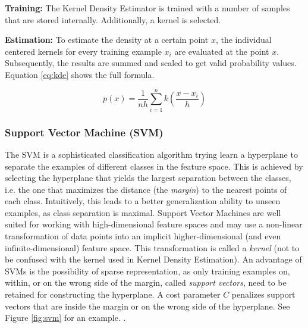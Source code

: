 \documentclass[
	ruledheaders=chapter,
	class=report,
	thesis={type=master, department=inf},
	accentcolor=1c,
	custommargins=true,
	marginpar=false,
	parskip=half-,
	fontsize=11pt,
]{tudapub}
\begin{document}
	\textbf{Training:} The Kernel Density Estimator is trained with a number of samples that are stored internally. Additionally, a kernel is selected.
	
	\textbf{Estimation:} To estimate the density at a certain point $x$, the individual centered kernels for every training example $x_i$ are evaluated at the point $x$. Subsequently, the results are summed and scaled to get valid probability values. Equation \ref{eq:kde} shows the full formula.
	
	\begin{equation}
		\label{eq:kde}
		p(x) = \frac{1}{nh}\sum_{i = 1}^{n} k\left(\frac{x - x_i}{h}\right)
	\end{equation}
		
	\subsubsection{Support Vector Machine (SVM)} 
	
	The SVM is a sophisticated classification algorithm trying learn a hyperplane to separate the examples of different classes in the feature space. This is achieved by selecting the hyperplane that yields the largest separation between the classes, i.e. the one that maximizes the distance (the \textit{margin}) to the nearest points of each class. Intuitively, this leads to a better generalization ability to unseen examples, as class separation is maximal. Support Vector Machines are well suited for working with high-dimensional feature spaces and may use a non-linear transformation of data points into an implicit higher-dimensional (and even infinite-dimensional) feature space. This transformation is called a \textit{kernel} (not to be confused with the kernel used in Kernel Density Estimation). An advantage of SVMs is the possibility of sparse representation, as only training examples on, within, or on the wrong side of the margin, called \textit{support vectors}, need to be retained for constructing the hyperplane. A cost parameter $C$ penalizes support vectors that are inside the margin or on the wrong side of the hyperplane. See Figure \ref{fig:svm} for an example. \cite{Boser1992,Cortes1995}.
	
\end{document}
